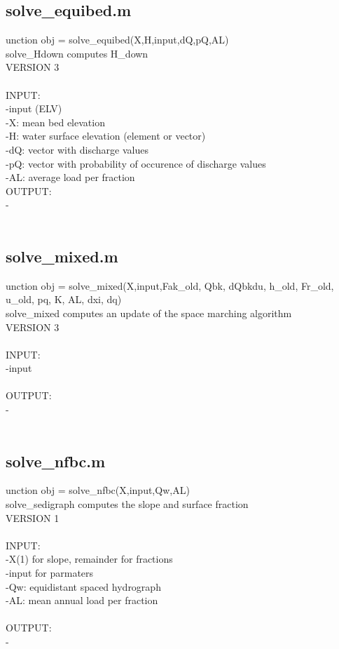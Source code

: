 \subsection{solve\_equibed.m}
unction obj = solve\_equibed(X,H,input,dQ,pQ,AL) \\ 
solve\_Hdown computes H\_down \\ 
 VERSION 3 \\ 
 \\ 
INPUT: \\ 
   -input (ELV) \\ 
   -X: mean bed elevation \\ 
   -H: water surface elevation (element or vector) \\ 
   -dQ: vector with discharge values \\ 
   -pQ: vector with probability of occurence of discharge values \\ 
   -AL: average load per fraction \\ 
OUTPUT: \\ 
   - \\ 
 \\ 
\subsection{solve\_mixed.m}
unction obj = solve\_mixed(X,input,Fak\_old, Qbk, dQbkdu, h\_old, Fr\_old, u\_old, pq, K, AL, dxi, dq) \\ 
solve\_mixed computes an update of the space marching algorithm \\ 
 VERSION 3 \\ 
 \\ 
INPUT: \\ 
   -input \\ 
 \\ 
OUTPUT: \\ 
   - \\ 
 \\ 
\subsection{solve\_nfbc.m}
unction obj = solve\_nfbc(X,input,Qw,AL) \\ 
solve\_sedigraph computes the slope and surface fraction  \\ 
 VERSION 1 \\ 
 \\ 
INPUT: \\ 
   -X(1) for slope, remainder for fractions \\ 
   -input for parmaters \\ 
   -Qw: equidistant spaced hydrograph \\ 
   -AL: mean annual load per fraction \\ 
 \\ 
OUTPUT: \\ 
   - \\ 
 \\ 
